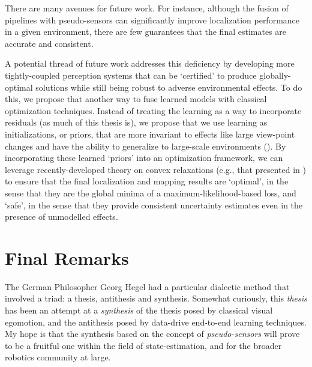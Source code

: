 There are many avenues for future work. For instance, although the fusion of pipelines with pseudo-sensors can significantly improve localization performance in a given environment, there are few guarantees that the final estimates are accurate and consistent.

A potential thread of future work addresses this deficiency by developing more tightly-coupled perception systems that can be ‘certified’ to produce globally-optimal solutions while still being robust to adverse environmental effects. To do this, we propose that another way to fuse learned models with classical optimization techniques. Instead of treating the learning as a way to incorporate residuals (as much of this thesis is), we propose that we use learning as initializations, or priors, that are more invariant to effects like large view-point changes and have the ability to generalize to large-scale environments (). By incorporating these learned ‘priors’ into an optimization framework, we can leverage recently-developed theory on convex relaxations (e.g., that presented in \cite{Rosen2019-kk}) to ensure that the final localization and mapping results are ‘optimal’, in the sense that they are the global minima of a maximum-likelihood-based loss, and ‘safe’, in the sense that they provide consistent uncertainty estimates even in the presence of unmodelled effects. 

\section{Final Remarks}

The German Philosopher Georg Hegel had a particular dialectic method that involved a triad: a thesis, antithesis and synthesis.
Somewhat curiously, this \textit{thesis} has been an attempt at a \textit{synthesis} of the thesis posed by classical visual egomotion, and the antithesis posed by data-drive end-to-end learning techniques.
My hope is that the synthesis based on the concept of \textit{pseudo-sensors} will prove to be a fruitful one within the field of state-estimation, and for the broader robotics community at large.
